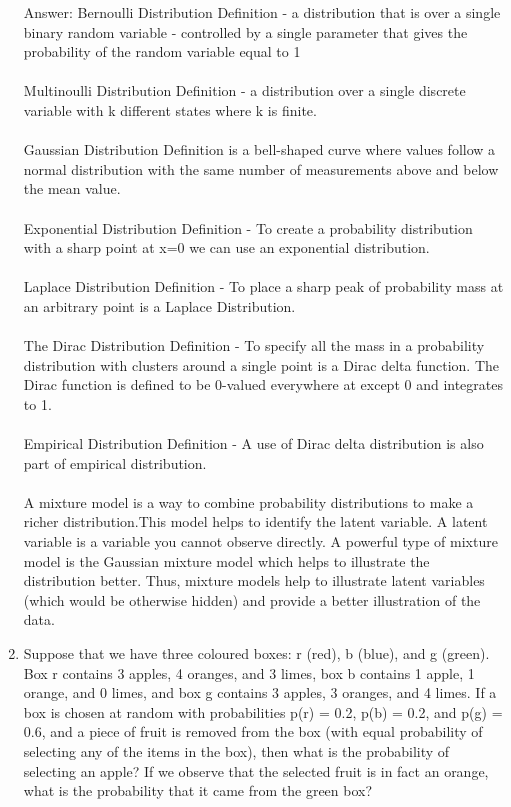 \documentclass[12pt]{article}
\begin{document}
\begin{enumerate}
 \item[Answer:]
Bernoulli Distribution
Definition - a distribution that is over a single binary random variable - controlled by a single parameter that gives the probability of the random variable equal to 1\\\\
Multinoulli Distribution
Definition - a distribution over a single discrete variable with k different states where k is finite. \\\\
Gaussian Distribution
Definition is a bell-shaped curve where values follow a normal distribution with the same number of measurements above and below the mean value.\\\\
Exponential Distribution
Definition - To create a probability distribution with a sharp point at x=0 we can use an exponential distribution. \\\\
 Laplace Distribution
Definition - To place a sharp peak of probability mass at an arbitrary point is a Laplace Distribution.\\\\
The Dirac Distribution
Definition - To specify all the mass in a probability distribution with clusters around a single point is a Dirac delta function. The Dirac function is defined to be 0-valued everywhere at except 0 and integrates to 1.\\\\
 Empirical Distribution
Definition - A use of Dirac delta distribution is also part of empirical distribution.
\\\\
A mixture model is a way to combine probability distributions to make a richer distribution.This model helps to identify the latent variable. A latent variable is a variable you cannot observe directly. A powerful type of mixture model is the Gaussian mixture model which helps to illustrate the distribution better. Thus, mixture models help to illustrate latent variables (which would be otherwise hidden) and provide a better illustration of the data.

\item Suppose that we have three coloured boxes: r (red), b (blue), and g (green).
Box r contains 3 apples, 4 oranges, and 3 limes, box b contains 1 apple, 1 orange, and 0
limes, and box g contains 3 apples, 3 oranges, and 4 limes. If a box is chosen at random
with probabilities p(r) = 0.2, p(b) = 0.2, and p(g) = 0.6, and a piece of fruit is removed
from the box (with equal probability of selecting any of the items in the box), then what
is the probability of selecting an apple? If we observe that the selected fruit is in fact an
orange, what is the probability that it came from the green box?


\end{enumerate}
\end{document}
